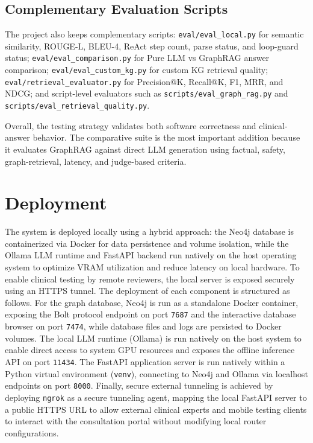 \documentclass[../main.tex]{subfiles}
\begin{document}
\subsection{Complementary Evaluation Scripts}
The project also keeps complementary scripts: \texttt{eval/eval\_local.py} for semantic similarity, ROUGE-L, BLEU-4, ReAct step count, parse status, and loop-guard status; \texttt{eval/eval\_comparison.py} for Pure LLM vs GraphRAG answer comparison; \texttt{eval/eval\_custom\_kg.py} for custom KG retrieval quality; \texttt{eval/retrieval\_evaluator.py} for Precision@K, Recall@K, F1, MRR, and NDCG; and script-level evaluators such as \texttt{scripts/eval\_graph\_rag.py} and \texttt{scripts/eval\_retrieval\_quality.py}.

Overall, the testing strategy validates both software correctness and clinical-answer behavior. The comparative suite is the most important addition because it evaluates GraphRAG against direct LLM generation using factual, safety, graph-retrieval, latency, and judge-based criteria.


\section{Deployment}
\label{section:4.5}

The system is deployed locally using a hybrid approach: the Neo4j database is containerized via Docker for data persistence and volume isolation, while the Ollama LLM runtime and FastAPI backend run natively on the host operating system to optimize VRAM utilization and reduce latency on local hardware. To enable clinical testing by remote reviewers, the local server is exposed securely using an HTTPS tunnel. The deployment of each component is structured as follows. For the graph database, Neo4j is run as a standalone Docker container, exposing the Bolt protocol endpoint on port \texttt{7687} and the interactive database browser on port \texttt{7474}, while database files and logs are persisted to Docker volumes. The local LLM runtime (Ollama) is run natively on the host system to enable direct access to system GPU resources and exposes the offline inference API on port \texttt{11434}. The FastAPI application server is run natively within a Python virtual environment (\texttt{venv}), connecting to Neo4j and Ollama via localhost endpoints on port \texttt{8000}. Finally, secure external tunneling is achieved by deploying \texttt{ngrok} as a secure tunneling agent, mapping the local FastAPI server to a public HTTPS URL to allow external clinical experts and mobile testing clients to interact with the consultation portal without modifying local router configurations.
\end{document}
